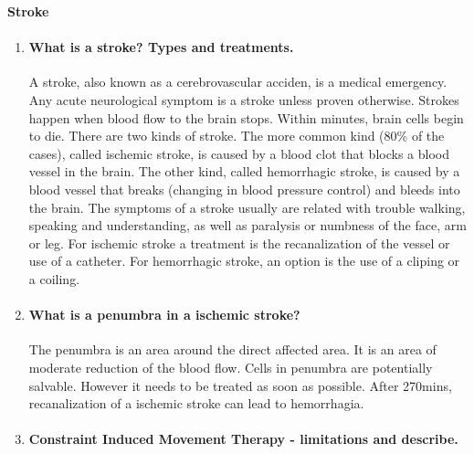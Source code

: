 \documentclass[12pt,article,oneside,a4paper]{memoir}
\begin{document}
\textbf{Stroke}\\
\begin{enumerate}
\item \paragraph{What is a stroke? Types and treatments.}
A stroke, also known as a cerebrovascular acciden, is a medical emergency. Any
acute neurological symptom is a stroke unless proven otherwise. Strokes happen
when blood flow to the brain stops.
Within minutes, brain cells begin to die. There are two kinds of stroke. The
more common kind (80\% of the cases), called ischemic stroke, is caused by a
blood clot that blocks a blood vessel in the brain. The other kind, called
hemorrhagic stroke, is caused by a blood vessel that breaks (changing in blood
pressure control) and bleeds into the brain.
The symptoms of a stroke usually are related with trouble walking, speaking and
understanding, as well as paralysis or numbness of the face, arm or leg.
For ischemic stroke a treatment is the recanalization of the vessel or use of a
catheter. For hemorrhagic stroke, an option is the use of a cliping or a
coiling.

\item \paragraph{What is a penumbra in a ischemic stroke?}
The penumbra is an area around the direct affected area. It is an area of
moderate reduction of the blood flow. Cells in penumbra are potentially
salvable. However it needs to be treated as soon as possible. After 270mins,
recanalization of a ischemic stroke can lead to hemorrhagia.

\item \paragraph{Constraint Induced Movement Therapy - limitations and
describe.}


\end{enumerate}
\end{document}
